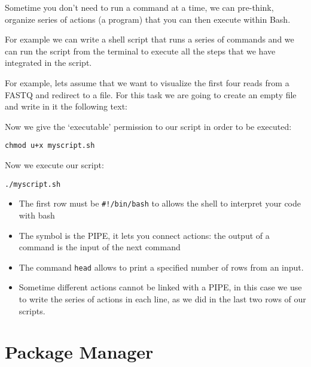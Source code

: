 \documentclass[
]{book}
\newenvironment{Shaded}{\begin{snugshade}}{\end{snugshade}}
\newcommand{\AttributeTok}[1]{\textcolor[rgb]{0.13,0.29,0.53}{#1}}
\newcommand{\BuiltInTok}[1]{#1}
\newcommand{\CommentTok}[1]{\textcolor[rgb]{0.56,0.35,0.01}{\textit{#1}}}
\newcommand{\FunctionTok}[1]{\textcolor[rgb]{0.13,0.29,0.53}{\textbf{#1}}}
\newcommand{\KeywordTok}[1]{\textcolor[rgb]{0.13,0.29,0.53}{\textbf{#1}}}
\newcommand{\NormalTok}[1]{#1}
\newcommand{\OperatorTok}[1]{\textcolor[rgb]{0.81,0.36,0.00}{\textbf{#1}}}
\newcommand{\StringTok}[1]{\textcolor[rgb]{0.31,0.60,0.02}{#1}}
\newcommand{\VariableTok}[1]{\textcolor[rgb]{0.00,0.00,0.00}{#1}}
\providecommand{\tightlist}{%
  \setlength{\itemsep}{0pt}\setlength{\parskip}{0pt}}
\begin{document}
Sometime you don't need to run a command at a time, we can pre-think, organize series of actions (a program) that you can then execute within Bash.

For example we can write a shell script that runs a series of commands and we can run the script from the terminal to execute all the steps that we have integrated in the script.

For example, lets assume that we want to visualize the first four reads from a FASTQ and redirect to a file. For this task we are going to create an empty file and write in it the following text:

\begin{Shaded}
\end{Shaded}

Now we give the `executable' permission to our script in order to be executed:

\texttt{chmod\ u+x\ myscript.sh}

Now we execute our script:

\texttt{./myscript.sh}

\begin{itemize}
\tightlist
\item
  The first row must be \texttt{\#!/bin/bash} to allows the shell to interpret your code with bash
\item
  The symbol \texttt{\textbar{}} is the PIPE, it lets you connect actions: the output of a command is the input of the next command
\item
  The command \texttt{head} allows to print a specified number of rows from an input.
\item
  Sometime different actions cannot be linked with a PIPE, in this case we use to write the series of actions in each line, as we did in the last two rows of our scripts.
\end{itemize}

\section{Package Manager}\label{package-manager}
\end{document}
